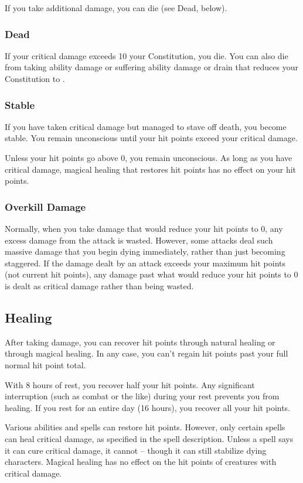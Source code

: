 If you take additional damage, you can die (see Dead, below).

\subsubsection{Dead}
If your critical damage exceeds 10 \add your Constitution, you die. You can also die from taking ability damage or suffering ability damage or drain that reduces your Constitution to .

\subsubsection{Stable}
If you have taken critical damage but managed to stave off death, you become stable. You remain unconscious until your hit points exceed your critical damage.

Unless your hit points go above 0, you remain unconscious. As long as you have critical damage, magical healing that restores hit points has no effect on your hit points.

\subsubsection{Overkill Damage}
Normally, when you take damage that would reduce your hit points to 0, any excess damage from the attack is wasted. However, some attacks deal such massive damage that you begin dying immediately, rather than just becoming staggered. If the damage dealt by an attack exceeds your maximum hit points (not current hit points), any damage past what would reduce your hit points to 0 is dealt as critical damage rather than being wasted.

\subsection{Healing}
After taking damage, you can recover hit points through natural healing or through magical healing. In any case, you can't regain hit points past your full normal hit point total.

 With 8 hours of rest, you recover half your hit points. Any significant interruption (such as combat or the like) during your rest prevents you from healing. If you rest for an entire day (16 hours), you recover all your hit points.

 Various abilities and spells can restore hit points. However, only certain spells can heal critical damage, as specified in the spell description. Unless a spell says it can cure critical damage, it cannot -- though it can still stabilize dying characters. Magical healing has no effect on the hit points of creatures with critical damage.

